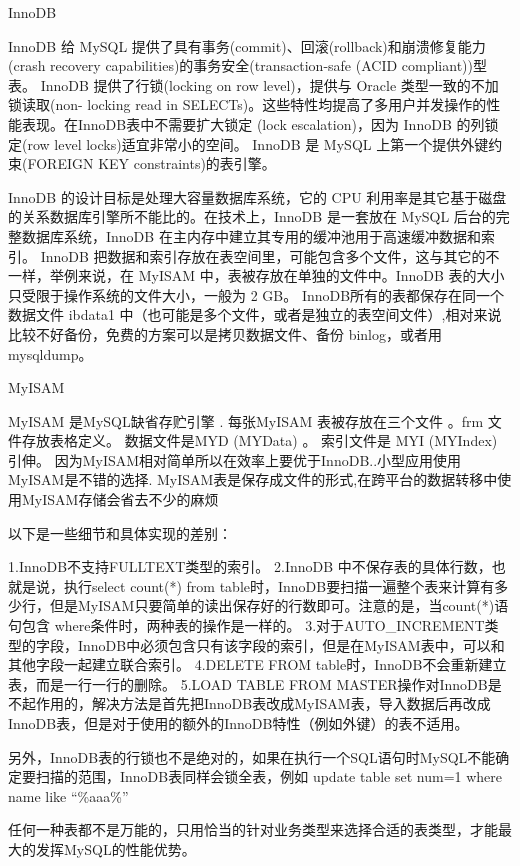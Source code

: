 \documentclass[UTF8]{ctexart}
\begin{document}
InnoDB

InnoDB 给 MySQL 提供了具有事务(commit)、回滚(rollback)和崩溃修复能力 (crash recovery capabilities)的事务安全(transaction-safe (ACID compliant))型表。 InnoDB 提供了行锁(locking on row level)，提供与 Oracle 类型一致的不加锁读取(non- locking read in SELECTs)。这些特性均提高了多用户并发操作的性能表现。在InnoDB表中不需要扩大锁定 (lock escalation)，因为 InnoDB 的列锁定(row level locks)适宜非常小的空间。 InnoDB 是 MySQL 上第一个提供外键约束(FOREIGN KEY constraints)的表引擎。  

InnoDB 的设计目标是处理大容量数据库系统，它的 CPU 利用率是其它基于磁盘的关系数据库引擎所不能比的。在技术上，InnoDB 是一套放在 MySQL 后台的完整数据库系统，InnoDB 在主内存中建立其专用的缓冲池用于高速缓冲数据和索引。 InnoDB 把数据和索引存放在表空间里，可能包含多个文件，这与其它的不一样，举例来说，在 MyISAM 中，表被存放在单独的文件中。InnoDB 表的大小只受限于操作系统的文件大小，一般为 2 GB。  
InnoDB所有的表都保存在同一个数据文件 ibdata1 中（也可能是多个文件，或者是独立的表空间文件）,相对来说比较不好备份，免费的方案可以是拷贝数据文件、备份 binlog，或者用 mysqldump。  

MyISAM   

MyISAM 是MySQL缺省存贮引擎 .   
每张MyISAM 表被存放在三个文件 。frm 文件存放表格定义。 数据文件是MYD (MYData) 。 索引文件是 MYI (MYIndex) 引伸。   
因为MyISAM相对简单所以在效率上要优于InnoDB..小型应用使用MyISAM是不错的选择.   
MyISAM表是保存成文件的形式,在跨平台的数据转移中使用MyISAM存储会省去不少的麻烦   
  
以下是一些细节和具体实现的差别：   
  
1.InnoDB不支持FULLTEXT类型的索引。   
2.InnoDB 中不保存表的具体行数，也就是说，执行select count(*) from table时，InnoDB要扫描一遍整个表来计算有多少行，但是MyISAM只要简单的读出保存好的行数即可。注意的是，当count(*)语句包含 where条件时，两种表的操作是一样的。  
3.对于AUTO\_INCREMENT类型的字段，InnoDB中必须包含只有该字段的索引，但是在MyISAM表中，可以和其他字段一起建立联合索引。   
4.DELETE FROM table时，InnoDB不会重新建立表，而是一行一行的删除。   
5.LOAD TABLE FROM MASTER操作对InnoDB是不起作用的，解决方法是首先把InnoDB表改成MyISAM表，导入数据后再改成InnoDB表，但是对于使用的额外的InnoDB特性（例如外键）的表不适用。  

另外，InnoDB表的行锁也不是绝对的，如果在执行一个SQL语句时MySQL不能确定要扫描的范围，InnoDB表同样会锁全表，例如 update table set num=1 where name like “\%aaa\%”  

任何一种表都不是万能的，只用恰当的针对业务类型来选择合适的表类型，才能最大的发挥MySQL的性能优势。   
\end{document}
